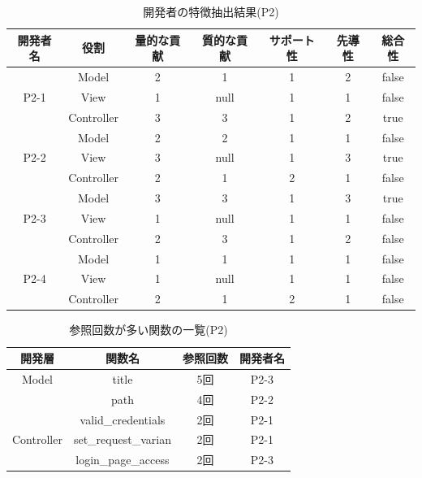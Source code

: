 \documentclass{funthesis}
\begin{document}
\begin{table}[H]
  \begin{center}
\begin{tabular}{|c|c|c|c|c|c|c|}
\hline
開発者名 & 役割 & 量的な貢献 & 質的な貢献 & サポート性 & 先導性 & 総合性\\ \hline
& Model & 2 & 1 & 1 & 2 & false\\ \cline{2-7}
P2-1 & View & 1 & null & 1 & 1 & false\\ \cline{2-7}
& Controller & 3 & 3 & 1 & 2 & true \\ \hline \hline

& Model & 2 & 2 & 1 & 1 & false\\ \cline{2-7}
P2-2 & View & 3 & null & 1 & 3 & true\\ \cline{2-7}
& Controller & 2 & 1 & 2 & 1 & false \\ \hline \hline

& Model & 3 & 3 & 1 & 3 & true\\ \cline{2-7}
P2-3 & View & 1 & null & 1 & 1 & false\\ \cline{2-7}
& Controller & 2 & 3 & 1 & 2 & false \\ \hline \hline

& Model & 1 & 1 & 1 & 1 & false\\ \cline{2-7}
P2-4 & View & 1 & null& 1 & 1 & false\\ \cline{2-7}
& Controller & 2 & 1 & 2 & 1 & false \\ \hline
\end{tabular}
  \end{center}
  \caption{開発者の特徴抽出結果(P2)}    \label{sample}
\end{table}
\begin{table}[H]
  \begin{center}
\begin{tabular}{|c|c|c|c|}\hline
開発層&関数名&参照回数&開発者名\\ \hline
Model& title & 5回 & P2-3 \\ \cline{2-4}
& path & 4回 & P2-2 \\ \cline{2-4}\hline\hline

& valid\_credentials & 2回 & P2-1 \\ \cline{2-4}
Controller& set\_request\_varian & 2回 & P2-1 \\ \cline{2-4}
& login\_page\_access & 2回 & P2-3 \\ \hline
\end{tabular}    
\caption{参照回数が多い関数の一覧(P2)}    \label{sample}
  \end{center}
\end{table}
\end{document}
